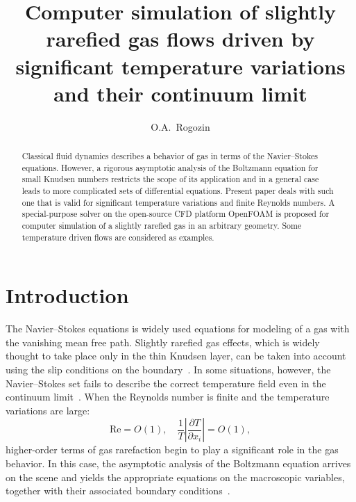 \documentclass[smallextended, referee]{svjour3} %
\newcommand{\pder}[2][]{\frac{\partial#1}{\partial#2}}
\begin{document}
\title{
	Computer simulation of slightly rarefied gas flows driven by significant temperature variations and their continuum limit
}

\author{O.A.~Rogozin}

\maketitle

\begin{abstract}
	Classical fluid dynamics describes a behavior of gas in terms of the
	Navier--Stokes equations. However, a rigorous asymptotic analysis of
	the Boltzmann equation for small Knudsen numbers restricts the scope
	of its application and in a general case leads to more complicated
	sets of differential equations. Present paper deals with such one
	that is valid for significant temperature variations and finite
	Reynolds numbers. A special-purpose solver on the open-source CFD
	platform OpenFOAM\textregistered{} is proposed for computer
	simulation of a slightly rarefied gas in an arbitrary geometry. Some
	temperature driven flows are considered as examples.
\end{abstract}

\section{Introduction}

The Navier--Stokes equations is widely used equations for modeling of a gas with the vanishing mean free path.
Slightly rarefied gas effects, which is widely thought to take place only in the thin Knudsen layer,
can be taken into account using the slip conditions on the boundary~\cite{SharipovCoefficients}.
In some situations, however, the Navier--Stokes set fails to describe the correct temperature field
even in the continuum limit~\cite{Kogan1976, GhostEffect}.
When the Reynolds number is finite and the temperature variations are large:
\[ \mathrm{Re} = O(1), \quad \frac1T\left|\pder[T]{x_i}\right| = O(1), \]
higher-order terms of gas rarefaction begin to play a significant role in the gas behavior.
In this case, the asymptotic analysis of the Boltzmann equation arrives on the scene and
yields the appropriate equations on the macroscopic variables, together with
their associated boundary conditions~\cite{Sone2002, Sone2007}.
\end{document}
